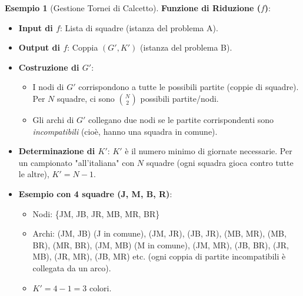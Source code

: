 \documentclass[a4paper]{article}
\theoremstyle{definition} %
\newtheorem{example}[theorem]{Esempio}
\begin{document}
\begin{example}[Gestione Tornei di Calcetto]
\textbf{Funzione di Riduzione ($f$)}:
\begin{itemize}
    \item \textbf{Input di $f$}: Lista di squadre (istanza del problema A).
    \item \textbf{Output di $f$}: Coppia $(G', K')$ (istanza del problema B).
    \item \textbf{Costruzione di $G'$}:
        \begin{itemize}
            \item I nodi di $G'$ corrispondono a tutte le possibili partite (coppie di squadre). Per $N$ squadre, ci sono $\binom{N}{2}$ possibili partite/nodi.
            \item Gli archi di $G'$ collegano due nodi se le partite corrispondenti sono \textit{incompatibili} (cioè, hanno una squadra in comune).
        \end{itemize}
    \item \textbf{Determinazione di $K'$}: $K'$ è il numero minimo di giornate necessarie. Per un campionato "all'italiana" con $N$ squadre (ogni squadra gioca contro tutte le altre), $K' = N-1$.
    \item \textbf{Esempio con 4 squadre (J, M, B, R)}:
        \begin{itemize}
            \item Nodi: \{JM, JB, JR, MB, MR, BR\}
            \item Archi: (JM, JB) (J in comune), (JM, JR), (JB, JR), (MB, MR), (MB, BR), (MR, BR), (JM, MB) (M in comune), (JM, MR), (JB, BR), (JR, MB), (JR, MR), (JB, MR) etc. (ogni coppia di partite incompatibili è collegata da un arco).
            \item $K' = 4-1 = 3$ colori.
        \end{itemize}
\end{itemize}

\begin{center}
\end{center}


\end{example}
\end{document}
